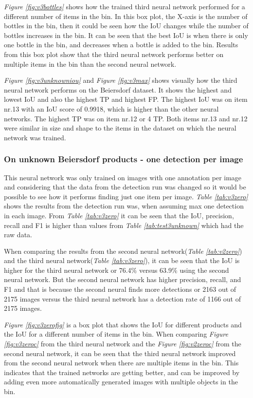 \textit{Figure \ref{fig:v3bottles}} shows how the trained third neural network performed for a different number of items in the bin. In this box plot, the X-axis is the number of bottles in the bin, then it could be seen how the IoU changes while the number of bottles increases in the bin. It can be seen that the best IoU is when there is only one bottle in the bin, and decreases when a bottle is added to the bin. Results from this box plot show that the third neural network performs better on multiple items in the bin than the second neural network.

\textit{Figure \ref{fig:v3unknowniou}} and \textit{Figure \ref{fig:v3max}} shows visually how the third neural network performs on the Beiersdorf dataset. It shows the highest and lowest IoU and also the highest TP and highest FP. The highest IoU was on item nr.13 with an IoU score of 0.9918, which is higher than the other neural networks. The highest TP was on item nr.12 or 4 TP. Both items nr.13 and nr.12 were similar in size and shape to the items in the dataset on which the neural network was trained.

\subsubsection{On unknown Beiersdorf products - one detection per image}
This neural network was only trained on images with one annotation per image and considering that the data from the detection run was changed so it would be possible to see how it performs finding just one item per image. \textit{Table \ref{tab:v3zero}} shows the results from the detection run was, when assuming max one detection in each image. From \textit{Table \ref{tab:v3zero}} it can be seen that the IoU, precision, recall and F1 is higher than values from \textit{Table \ref{tab:test3unknown}} which had the raw data.

When comparing the results from the second neural network(\textit{Table \ref{tab:v2zero}}) and the third neural network(\textit{Table \ref{tab:v3zero}}), it can be seen that the IoU is higher for the third neural network or 76.4\% versus 63.9\% using the second neural network. But the second neural network has higher precision, recall, and F1 and that is because the second neural finds more detections or 2163 out of 2175 images versus the third neural network has a detection rate of 1166 out of 2175 images. 

\textit{Figure \ref{fig:v3zerofig}} is a box plot that shows the IoU for different products and the IoU for a different number of items in the bin. When comparing \textit{Figure \ref{fig:v3zeroc}} from the third neural network and the \textit{Figure \ref{fig:v2zeroc}} from the second neural network, it can be seen that the third neural network improved from the second neural network when there are multiple items in the bin. This indicates that the trained networks are getting better, and can be improved by adding even more automatically generated images with multiple objects in the bin.



